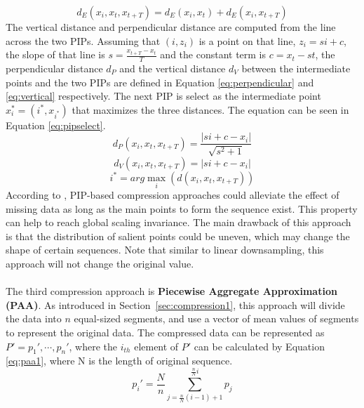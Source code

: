 \begin{equation}
    \label{eq:euclideandoulbe}
    d_E(x_i, x_t, x_{t+T}) = d_E(x_i, x_t) + d_E(x_i, x_{t+T})
\end{equation}
The vertical distance and perpendicular distance are computed from the line across the two PIPs. Assuming that $(i,z_i)$ is a point on that line, $z_i = si+c$, the slope of that line is $s = \frac{x_{t+T} - x_t}{T}$ and the constant term is $c = x_t - st$, the perpendicular distance $d_P$ and the vertical distance $d_V$ between the intermediate points and the two PIPs are defined in Equation \ref{eq:perpendicular} and \ref{eq:vertical} respectively. The next PIP is select as the intermediate point $x_i^* = (i^*, x_{i^*})$ that maximizes the three distances. The equation can be seen in Equation \ref{eq:pipselect}.
\begin{equation}
    \label{eq:perpendicular}
    d_P(x_i, x_t, x_{t+T}) = \frac{|si+c-x_i|}{\sqrt{s^2+1}}
\end{equation}
\begin{equation}
    \label{eq:vertical}
    d_V(x_i, x_t, x_{t+T}) = |si+c-x_i|
\end{equation}
\begin{equation}
    \label{eq:pipselect}
    i^* = arg\max_i(d(x_i, x_t, x_{t+T}))
\end{equation}
According to \cite{zaib2004pattern}, PIP-based compression approaches could alleviate the effect of missing data as long as the main points to form the sequence exist. This property can help to reach global scaling invariance. The main drawback of this approach is that the distribution of salient points could be uneven, which may change the shape of certain sequences. Note that similar to linear downsampling, this approach will not change the original value.\\
\\ The third compression approach is \textbf{Piecewise Aggregate Approximation (PAA)}. As introduced in Section~\ref{sec:compression1}, this approach will divide the data into $n$ equal-sized segments, and use a vector of mean values of segments to represent the original data. The compressed data can be represented as $P\prime = {p_1\prime, \cdots, p_n\prime}$, where the $i_{th}$ element of $P\prime$ can be calculated by Equation \ref{eq:paa1}, where N is the length of original sequence.
\begin{equation}
    \label{eq:paa1}
    p_i\prime = \frac{N}{n} \sum_{j=\frac{n}{N}(i-1)+1}^{\frac{n}{N}i} p_j
\end{equation}

